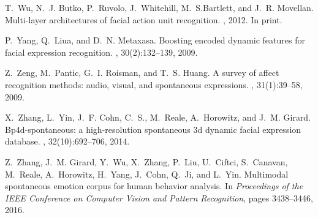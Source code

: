 \documentclass[a4paper, 10pt, conference]{ieeeconf}      \usepackage{FG2017}
\begin{document}
\begin{thebibliography}{10}
T.~Wu, N.~J. Butko, P.~Ruvolo, J.~Whitehill, M.~S.Bartlett, and J.~R. Movellan.
\newblock Multi-layer architectures of facial action unit recognition.
, 2012.
\newblock In print.

P.~Yang, Q.~Liua, and D.~N. Metaxasa.
\newblock Boosting encoded dynamic features for facial expression recognition.
, 30(2):132--139, 2009.

Z.~Zeng, M.~Pantic, G.~I. Roisman, and T.~S. Huang.
\newblock A survey of affect recognition methods: audio, visual, and
  spontaneous expressions.
,
  31(1):39--58, 2009.

X.~Zhang, L.~Yin, J.~F. Cohn, C.~S., M.~Reale, A.~Horowitz, and J.~M. Girard.
\newblock Bp4d-spontaneous: a high-resolution spontaneous 3d dynamic facial
  expression database.
, 32(10):692--706, 2014.

Z.~Zhang, J.~M. Girard, Y.~Wu, X.~Zhang, P.~Liu, U.~Ciftci, S.~Canavan,
  M.~Reale, A.~Horowitz, H.~Yang, J.~Cohn, Q.~Ji, and L.~Yin.
\newblock Multimodal spontaneous emotion corpus for human behavior analysis.
\newblock In {\em Proceedings of the IEEE Conference on Computer Vision and
  Pattern Recognition}, pages 3438--3446, 2016.

\end{thebibliography}
\end{document}
